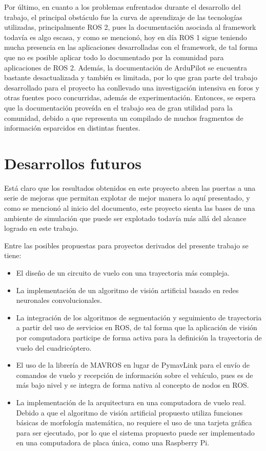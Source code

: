 Por último, en cuanto a los problemas enfrentados durante el desarrollo del trabajo, el principal obstáculo fue la curva de aprendizaje de las tecnologías utilizadas, principalmente ROS 2, pues la documentación asociada al framework todavía es algo escasa, y como se mencionó, hoy en día ROS 1 sigue teniendo mucha presencia en las aplicaciones desarrolladas con el framework, de tal forma que no es posible aplicar todo lo documentado por la comunidad para aplicaciones de ROS 2. Además, la documentación de ArduPilot se encuentra bastante desactualizada y también es limitada, por lo que gran parte del trabajo desarrollado para el proyecto ha conllevado una investigación intensiva en foros y otras fuentes poco concurridas, además de experimentación. Entonces, se espera que la documentación proveída en el trabajo sea de gran utilidad para la comunidad, debido a que representa un compilado de muchos fragmentos de información esparcidos en distintas fuentes.

\section{Desarrollos futuros}

Está claro que los resultados obtenidos en este proyecto abren las puertas a una serie de mejoras que permitan explotar de mejor manera lo aquí presentado, y como se mencionó al inicio del documento, este proyecto sienta las bases de una ambiente de simulación que puede ser explotado todavía más allá del alcance logrado en este trabajo. 

Entre las posibles propuestas para proyectos derivados del presente trabajo se tiene:

\begin{itemize}
    \item El diseño de un circuito de vuelo con una trayectoria más compleja.
    \item La implementación de un algoritmo de visión artificial basado en redes neuronales convolucionales.
    \item La integración de los algoritmos de segmentación y seguimiento de trayectoria a partir del uso de servicios en ROS, de tal forma que la aplicación de visión por computadora participe de forma activa para la definición la trayectoria de vuelo del cuadricóptero.
    \item El uso de la librería de MAVROS en lugar de PymavLink para el envío de comandos de vuelo y recepción de información sobre el vehículo, pues es de más bajo nivel y se integra de forma nativa al concepto de nodos en ROS.
    \item La implementación de la arquitectura en una computadora de vuelo real. Debido a que el algoritmo de visión artificial propuesto utiliza funciones básicas de morfología matemática, no requiere el uso de una tarjeta gráfica para ser ejecutado, por lo que el sistema propuesto puede ser implementado en una computadora de placa única, como una Raspberry Pi.
\end{itemize}